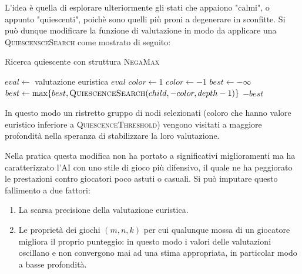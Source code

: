 \documentclass{article}
\begin{document}
L'idea \`e quella di esplorare ulteriormente gli stati che appaiono "calmi", o  %
appunto "quiescenti", poich\`e sono quelli pi\`u proni a degenerare in sconfitte.
Si pu\`o dunque modificare la funzione di valutazione in modo da applicare una
\textsc{QuiescensceSearch} come mostrato di seguito:

\begin{algorithm}[H]
  \caption{Ricerca quiescente con struttura \textsc{NegaMax}}
  \label{qs}
  \begin{algorithmic}[0]
      \State $eval \gets $ valutazione euristica
        \State \Return $eval$
      \Else
        \State $color \gets 1$
          \State $color \gets -1$
        \EndIf
        \State \Return {}
      \EndIf
    \EndProcedure
    \Statex
      \State \Return {}
    \EndIf
    \State $best \gets -\infty$
      \State $best \gets \max\{best, \Call{QuiescenceSearch}{child, -color, depth-1}\}$
    \EndFor
    \State \Return $-best$
    \EndProcedure
  \end{algorithmic}
\end{algorithm}

In questo modo un ristretto gruppo di nodi selezionati (coloro che hanno valore
euristico inferiore a \textsc{QuiescenceThreshold}) vengono visitati a maggiore
profondit\`a nella speranza di stabilizzare la loro valutazione.

Nella pratica questa modifica non ha portato a significativi miglioramenti
ma ha caratterizzato l'AI con uno stile di gioco pi\`u difensivo, il quale ne ha
peggiorato le prestazioni contro giocatori poco astuti o casuali.
Si pu\`o imputare questo fallimento a due fattori:
\begin{enumerate}
  \item La scarsa precisione della valutazione euristica.
  \item Le propriet\`a dei giochi $(m,n,k)$ per cui qualunque mossa di un
    giocatore migliora il proprio punteggio: in questo modo i valori delle
    valutazioni oscillano e non convergono mai ad una stima appropriata, in
    particolar modo a basse profondit\`a.
\end{enumerate}
\end{document}
